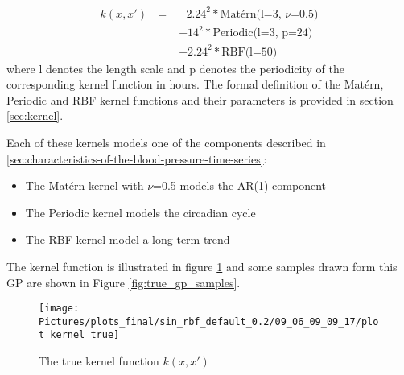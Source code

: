 \begin{align*}\label{def:true_gp}
    k(x, x') \text{ } = &\text{ } 2.24^{2} * \text{Matérn(l=3, $\nu$=0.5)} \\
             &+  14^{2} * \text{Periodic(l=3, p=24)} \\
             &+  2.24^{2} * \text{RBF(l=50)}
\end{align*}
where l denotes the length scale and p denotes the periodicity
of the corresponding kernel function in hours.
The formal definition of the Matérn, Periodic and RBF kernel
functions and their parameters is provided in section \ref{sec:kernel}.

Each of these kernels models one of the components described in
\ref{sec:characteristics-of-the-blood-pressure-time-series}:
\begin{itemize}
    \item The Matérn kernel with $\nu$=0.5 models the AR(1) component
    \item The Periodic kernel models the circadian cycle
    \item The RBF kernel model a long term trend
\end{itemize}

The kernel function is illustrated in figure \ref{fig:true_kernel} and
some samples drawn form this GP are shown in Figure \ref{fig:true_gp_samples}.

\begin{figure}
    \centering
    \texttt{[image: Pictures/plots\_final/sin\_rbf\_default\_0.2/09\_06\_09\_09\_17/plot\_kernel\_true]}
    \caption{The true kernel function $k(x,x')$}
    \label{fig:true_kernel}
\end{figure}

